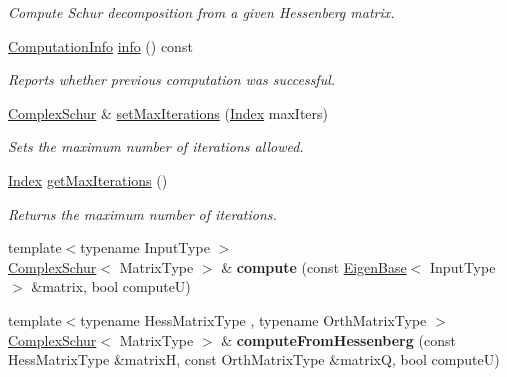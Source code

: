 \begin{DoxyCompactItemize}
\begin{DoxyCompactList}\small\item\em Compute Schur decomposition from a given Hessenberg matrix. \end{DoxyCompactList}\item 
\hyperlink{group__enums_ga85fad7b87587764e5cf6b513a9e0ee5e}{Computation\+Info} \hyperlink{group___eigenvalues___module_a8c5ee15fecfd126fc362c3f2fd28f51e}{info} () const
\begin{DoxyCompactList}\small\item\em Reports whether previous computation was successful. \end{DoxyCompactList}\item 
\hyperlink{group___eigenvalues___module_class_eigen_1_1_complex_schur}{Complex\+Schur} \& \hyperlink{group___eigenvalues___module_a6ca227fbd5387f3a625351354b8eec44}{set\+Max\+Iterations} (\hyperlink{group___eigenvalues___module_a652104d13723a5b1db2937866a034557}{Index} max\+Iters)
\begin{DoxyCompactList}\small\item\em Sets the maximum number of iterations allowed. \end{DoxyCompactList}\item 
\mbox{\label{group___eigenvalues___module_a2fc0b7bc409a49e7cdb7b6edcfff26eb}} 
\hyperlink{group___eigenvalues___module_a652104d13723a5b1db2937866a034557}{Index} \hyperlink{group___eigenvalues___module_a2fc0b7bc409a49e7cdb7b6edcfff26eb}{get\+Max\+Iterations} ()
\begin{DoxyCompactList}\small\item\em Returns the maximum number of iterations. \end{DoxyCompactList}\item 
\mbox{\label{group___eigenvalues___module_a7c183daf4071decc78ae6a0ca17b4029}} 
{\footnotesize template$<$typename Input\+Type $>$ }\\\hyperlink{group___eigenvalues___module_class_eigen_1_1_complex_schur}{Complex\+Schur}$<$ Matrix\+Type $>$ \& {\bfseries compute} (const \hyperlink{group___core___module_struct_eigen_1_1_eigen_base}{Eigen\+Base}$<$ Input\+Type $>$ \&matrix, bool computeU)
\item 
\mbox{\label{group___eigenvalues___module_ad9632cae34663c45b9c9e90b3dc76169}} 
{\footnotesize template$<$typename Hess\+Matrix\+Type , typename Orth\+Matrix\+Type $>$ }\\\hyperlink{group___eigenvalues___module_class_eigen_1_1_complex_schur}{Complex\+Schur}$<$ Matrix\+Type $>$ \& {\bfseries compute\+From\+Hessenberg} (const Hess\+Matrix\+Type \&matrixH, const Orth\+Matrix\+Type \&matrixQ, bool computeU)
\end{DoxyCompactItemize}
